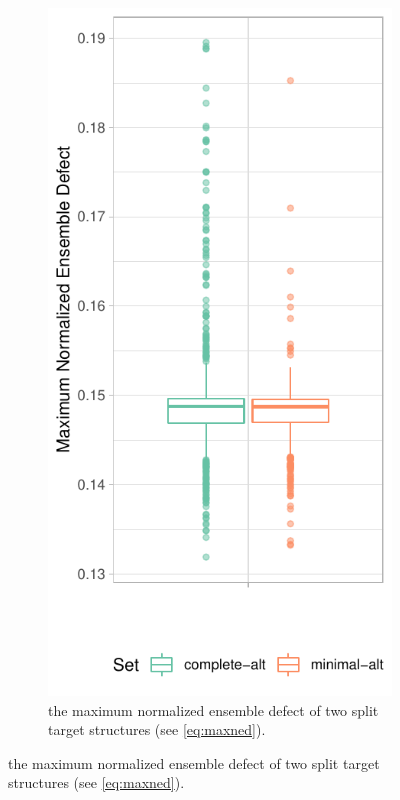 \documentclass[../../master.tex]{subfiles}
\begin{document}
\begin{figure}[!ht]
	\begin{subfigure}[t]{0.2\textwidth}
		\centering
		\includegraphics[width=\textwidth]{pic/results/designs/boxplots/alt-score-boxplot.pdf}
		\caption{the maximum normalized ensemble defect of two split target structures (see \autoref{eq:maxned}).
}
\end{subfigure}
\end{figure}
\end{document}

